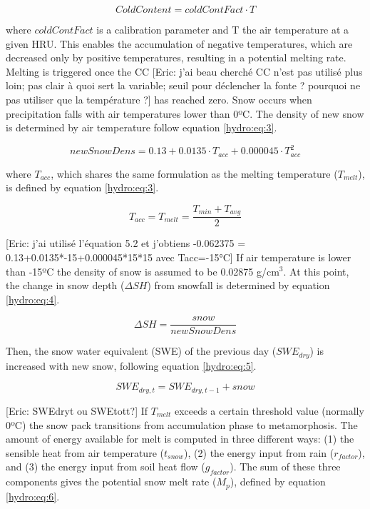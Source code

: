 \begin{equation} \label{hydro:eq:1}
 ColdContent = coldContFact \cdot T
 \end{equation} 
 
where $coldContFact$ is a calibration parameter and T the air temperature at a given HRU. This enables the accumulation of negative temperatures, which are decreased only by positive temperatures, resulting in a potential melting rate. Melting is triggered once the CC [Eric: j'ai beau cherché CC n'est pas utilisé plus loin; pas clair à quoi sert la variable; seuil pour déclencher la fonte ? pourquoi ne pas utiliser que la température ?] has reached zero. Snow occurs when precipitation falls with air temperatures lower than 0ºC. The density of new snow is determined by air temperature follow equation \ref{hydro:eq:3}.

\begin{equation} \label{hydro:eq:2}
 newSnowDens = 0.13 + 0.0135 \cdot T_{acc} + 0.000045 \cdot T_{acc}^{2}
\end{equation} 
 
where $T_{acc}$, which shares the same formulation as the melting temperature ($T_{melt}$), is defined by equation \ref{hydro:eq:3}.

\begin{equation} \label{hydro:eq:3}
 T_{acc} = T_{melt} = \frac{T_{min} + T_{avg}}{2}
\end{equation} 

[Eric: j'ai utilisé l'équation 5.2 et j'obtiens  -0.062375 = 0.13+0.0135*-15+0.000045*15*15 avec Tacc=-15°C] If air temperature is lower than -15ºC the density of snow is assumed to be 0.02875 g/cm$^{3}$. At this point, the change in snow depth ($\Delta SH$) from snowfall is determined by equation \ref{hydro:eq:4}.

\begin{equation} \label{hydro:eq:4}
 \Delta SH = \frac{snow}{newSnowDens}
\end{equation} 

Then, the snow water equivalent (SWE) of the previous day ($SWE_{dry}$) is increased with new snow, following equation \ref{hydro:eq:5}.

\begin{equation} \label{hydro:eq:5}
 SWE_{dry,t} = SWE_{dry,t-1} + snow
\end{equation} 

[Eric: SWEdryt ou SWEtott?] If $T_{melt}$ exceeds a certain threshold value (normally 0ºC) the snow pack transitions from accumulation phase to metamorphosis. The amount of energy available for melt is computed in three different ways: (1) the sensible heat from air temperature ($t_{snow}$), (2) the energy input from rain ($r_{factor}$), and (3) the energy input from soil heat flow ($g_{factor}$). The sum of these three components gives the potential snow melt rate ($M_{p}$), defined by equation \ref{hydro:eq:6}.

